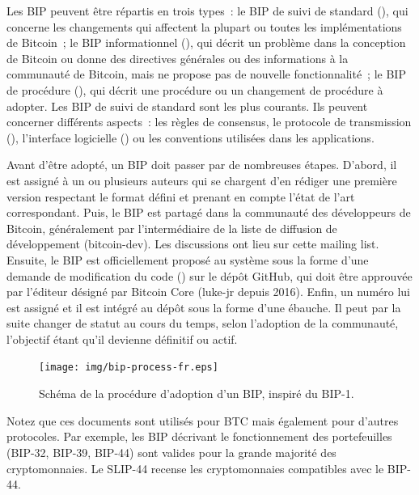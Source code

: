 Les BIP peuvent être répartis en trois types~: le BIP de suivi de standard (), qui concerne les changements qui affectent la plupart ou toutes les implémentations de Bitcoin~; le BIP informationnel (), qui décrit un problème dans la conception de Bitcoin ou donne des directives générales ou des informations à la communauté de Bitcoin, mais ne propose pas de nouvelle fonctionnalité~; le BIP de procédure (), qui décrit une procédure ou un changement de procédure à adopter. Les BIP de suivi de standard sont les plus courants. Ils peuvent concerner différents aspects~: les règles de consensus, le protocole de transmission (), l'interface logicielle () ou les conventions utilisées dans les applications.

Avant d'être adopté, un BIP doit passer par de nombreuses étapes. D'abord, il est assigné à un ou plusieurs auteurs qui se chargent d'en rédiger une première version respectant le format défini et prenant en compte l'état de l'art correspondant. Puis, le BIP est partagé dans la communauté des développeurs de Bitcoin, généralement par l'intermédiaire de la liste de diffusion de développement (bitcoin-dev). Les discussions ont lieu sur cette mailing list. Ensuite, le BIP est officiellement proposé au système sous la forme d'une demande de modification du code () sur le dépôt GitHub, qui doit être approuvée par l'éditeur désigné par Bitcoin Core (luke-jr depuis 2016). Enfin, un numéro lui est assigné et il est intégré au dépôt sous la forme d'une ébauche. Il peut par la suite changer de statut au cours du temps, selon l'adoption de la communauté, l'objectif étant qu'il devienne définitif ou actif.

\begin{figure}[h]
  \centering
  \texttt{[image: img/bip-process-fr.eps]}
  \caption{Schéma de la procédure d'adoption d'un BIP, inspiré du BIP-1.}
\end{figure}

Notez que ces documents sont utilisés pour BTC mais également pour d'autres protocoles. Par exemple, les BIP décrivant le fonctionnement des portefeuilles (BIP-32, BIP-39, BIP-44) sont valides pour la grande majorité des cryptomonnaies. Le SLIP-44 recense les cryptomonnaies compatibles avec le BIP-44.

